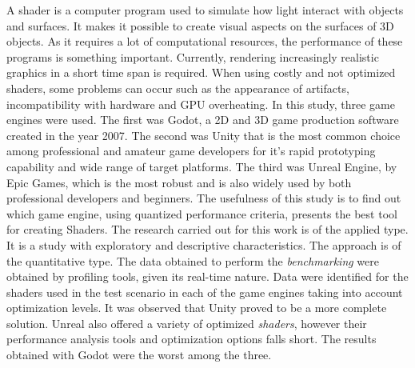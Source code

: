 A shader is a computer program used to simulate how light interact with objects and surfaces. It makes it possible to create visual aspects on the surfaces of 3D objects. As it requires a lot of computational resources, the performance of these programs is something important. Currently, rendering increasingly realistic graphics in a short time span is required. When using costly and not optimized shaders, some problems can occur such as the appearance of artifacts, incompatibility with hardware and GPU overheating. In this study, three game engines were used. The first was Godot, a 2D and 3D game production software created in the year 2007. The second was Unity that is the most common choice among professional and amateur game developers for it's rapid prototyping capability and wide range of target platforms. The third was Unreal Engine, by Epic Games, which is the most robust and is also widely used by both professional developers and beginners. The usefulness of this study is to find out which game engine, using quantized performance criteria, presents the best tool for creating Shaders. The research carried out for this work is of the applied type. It is a study with exploratory and descriptive characteristics. The approach is of the quantitative type. The data obtained to perform the \textit{benchmarking} were obtained by profiling tools, given its real-time nature. Data were identified for the shaders used in the test scenario in each of the game engines taking into account optimization levels. It was observed that Unity proved to be a more complete solution. Unreal also offered a variety of optimized \textit{shaders}, however their performance analysis tools and optimization options falls short. The results obtained with Godot were the worst among the three.


